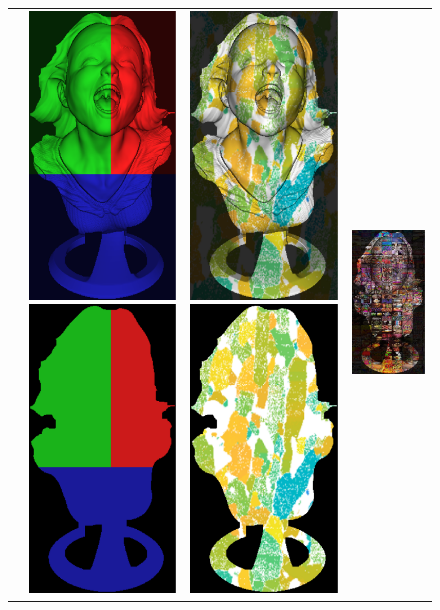 \begin{figure}
  \setlength{\tabcolsep}{0.5em} %
{\renewcommand{\arraystretch}{0.6}%
\begin{tabular}{cccc}
&
    \includegraphics[height=0.25\linewidth]{figures/result/comp_simple_rgb.pdf}
    \includegraphics[height=0.25\linewidth]{figures/result/comp_simple_albedo.pdf}& 
    \includegraphics[height=0.25\linewidth]{figures/result/comp_pattern_rgb.pdf} 
    \includegraphics[height=0.25\linewidth]{figures/result/comp_pattern_albedo.pdf}& 
    \includegraphics[height=0.25\linewidth]{figures/result/comp_love_rgb.pdf}

\end{tabular}}
\end{figure}
